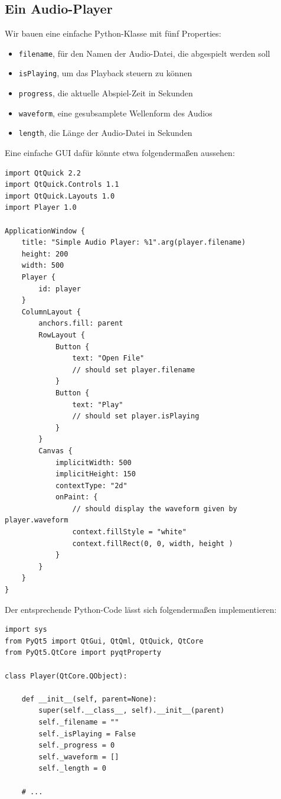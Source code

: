 \documentclass[a4paper]{article}
\begin{document}
\subsection{Ein Audio-Player}
\label{sec-4-2}
Wir bauen eine einfache Python-Klasse mit fünf Properties:
\begin{itemize}
\item \verb~filename~, für den Namen der Audio-Datei, die abgespielt werden soll
\item \verb~isPlaying~, um das Playback steuern zu können
\item \verb~progress~, die aktuelle Abspiel-Zeit in Sekunden
\item \verb~waveform~, eine gesubsamplete Wellenform des Audios
\item \verb~length~, die Länge der Audio-Datei in Sekunden
\end{itemize}

Eine einfache GUI dafür könnte etwa folgendermaßen aussehen:

\begin{verbatim}
import QtQuick 2.2
import QtQuick.Controls 1.1
import QtQuick.Layouts 1.0
import Player 1.0

ApplicationWindow {
    title: "Simple Audio Player: %1".arg(player.filename)
    height: 200
    width: 500
    Player {
        id: player
    }
    ColumnLayout {
        anchors.fill: parent
        RowLayout {
            Button {
                text: "Open File"
                // should set player.filename
            }
            Button {
                text: "Play"
                // should set player.isPlaying
            }
        }
        Canvas {
            implicitWidth: 500
            implicitHeight: 150
            contextType: "2d"
            onPaint: {
                // should display the waveform given by player.waveform
                context.fillStyle = "white"
                context.fillRect(0, 0, width, height )
            }
        }
    }
}
\end{verbatim}

Der entsprechende Python-Code lässt sich folgendermaßen implementieren:

\begin{verbatim}
import sys
from PyQt5 import QtGui, QtQml, QtQuick, QtCore
from PyQt5.QtCore import pyqtProperty

class Player(QtCore.QObject):

    def __init__(self, parent=None):
        super(self.__class__, self).__init__(parent)
        self._filename = ""
        self._isPlaying = False
        self._progress = 0
        self._waveform = []
        self._length = 0

    # ...
\end{verbatim}
\end{document}
